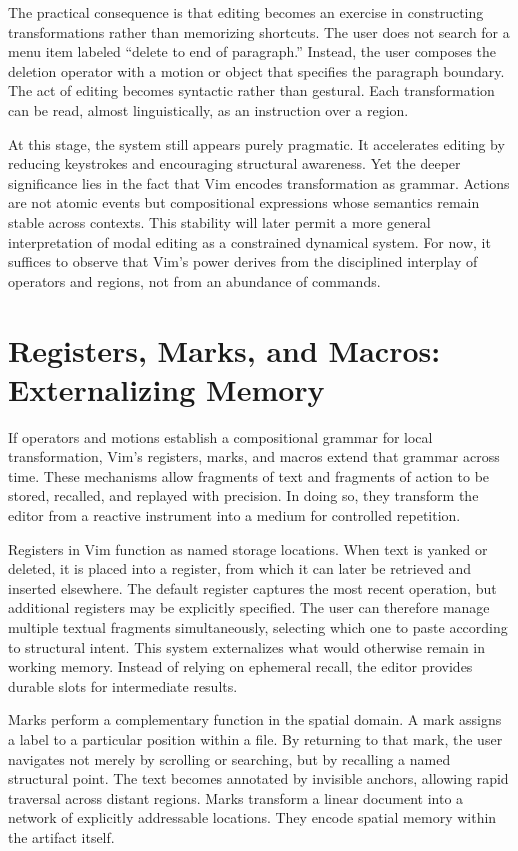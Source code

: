 \documentclass[12pt]{article}
\begin{document}
The practical consequence is that editing becomes an exercise in constructing transformations rather than memorizing shortcuts. The user does not search for a menu item labeled “delete to end of paragraph.” Instead, the user composes the deletion operator with a motion or object that specifies the paragraph boundary. The act of editing becomes syntactic rather than gestural. Each transformation can be read, almost linguistically, as an instruction over a region.

At this stage, the system still appears purely pragmatic. It accelerates editing by reducing keystrokes and encouraging structural awareness. Yet the deeper significance lies in the fact that Vim encodes transformation as grammar. Actions are not atomic events but compositional expressions whose semantics remain stable across contexts. This stability will later permit a more general interpretation of modal editing as a constrained dynamical system. For now, it suffices to observe that Vim’s power derives from the disciplined interplay of operators and regions, not from an abundance of commands.

\section{Registers, Marks, and Macros: Externalizing Memory}

If operators and motions establish a compositional grammar for local transformation, Vim’s registers, marks, and macros extend that grammar across time. These mechanisms allow fragments of text and fragments of action to be stored, recalled, and replayed with precision. In doing so, they transform the editor from a reactive instrument into a medium for controlled repetition.

Registers in Vim function as named storage locations. When text is yanked or deleted, it is placed into a register, from which it can later be retrieved and inserted elsewhere. The default register captures the most recent operation, but additional registers may be explicitly specified. The user can therefore manage multiple textual fragments simultaneously, selecting which one to paste according to structural intent. This system externalizes what would otherwise remain in working memory. Instead of relying on ephemeral recall, the editor provides durable slots for intermediate results.

Marks perform a complementary function in the spatial domain. A mark assigns a label to a particular position within a file. By returning to that mark, the user navigates not merely by scrolling or searching, but by recalling a named structural point. The text becomes annotated by invisible anchors, allowing rapid traversal across distant regions. Marks transform a linear document into a network of explicitly addressable locations. They encode spatial memory within the artifact itself.
\end{document}

